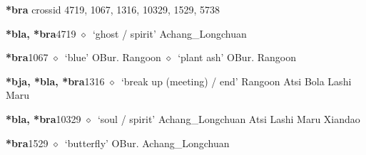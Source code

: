 \item
\textbf{*bra}
  {\tiny crossid 4719, 1067, 1316, 10329, 1529, 5738}
  \begin{list}{}{\leftmargin=1.5em \itemindent=-1.5em}
  \item {\footnotesize \textbf{*bla, *bra}}{\tiny 4719}
         $\diamond$~`ghost / spirit'
         Achang\_Longchuan 
  \item {\footnotesize \textbf{*bra}}{\tiny 1067}
\hspace{1ex}
         $\diamond$~`blue'
         OBur. 
\hspace{1ex}
         Rangoon 
\hspace{1ex}
         $\diamond$~`plant ash'
         OBur. 
\hspace{1ex}
         Rangoon 
  \item {\footnotesize \textbf{*bja, *bla, *bra}}{\tiny 1316}
\hspace{1ex}
         $\diamond$~`break up (meeting) / end'
         Rangoon 
\hspace{1ex}
         Atsi 
\hspace{1ex}
         Bola 
\hspace{1ex}
         Lashi 
\hspace{1ex}
         Maru 
  \item {\footnotesize \textbf{*bla, *bra}}{\tiny 10329}
\hspace{1ex}
         $\diamond$~`soul / spirit'
         Achang\_Longchuan 
\hspace{1ex}
         Atsi 
\hspace{1ex}
         Lashi 
\hspace{1ex}
         Maru 
\hspace{1ex}
         Xiandao 
  \item {\footnotesize \textbf{*bra}}{\tiny 1529}
\hspace{1ex}
         $\diamond$~`butterfly'
         OBur. 
\hspace{1ex}
         Achang\_Longchuan 

\end{list}
